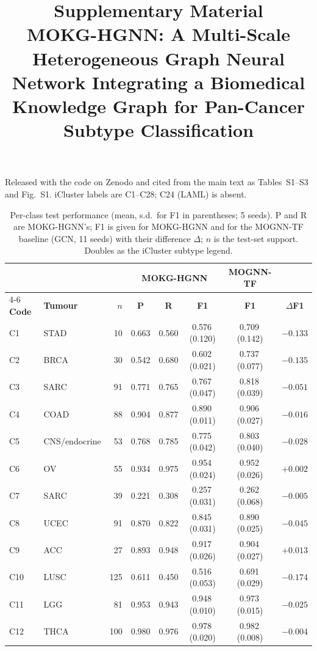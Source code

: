\documentclass[10pt]{article}
\title{\vspace{-1.2em}Supplementary Material\\[0.2em]
\large MOKG-HGNN: A Multi-Scale Heterogeneous Graph Neural Network
Integrating a Biomedical Knowledge Graph for Pan-Cancer Subtype
Classification}
\author{}
\date{}
\begin{document}
\maketitle
\vspace{-2.2em}

\noindent Released with the code on Zenodo and cited from the main text as
Tables~S1--S3 and Fig.~S1. iCluster labels are C1--C28; C24 (LAML) is absent.

\begin{table}[h]
\centering
\caption{Per-class test performance (mean, s.d.\ for F1 in parentheses;
5 seeds). P and R are MOKG-HGNN's; F1 is given for MOKG-HGNN and for the
MOGNN-TF baseline (GCN, 11 seeds) with their difference $\Delta$; $n$ is the
test-set support. Doubles as the iCluster subtype legend.}
\label{tab:s_per_class}
\small
\setlength{\tabcolsep}{5pt}
\begin{tabular}{llr ccc c c}
\toprule
 & & & \multicolumn{3}{c}{\textbf{MOKG-HGNN}} & \textbf{MOGNN-TF} & \\
\cmidrule(lr){4-6}
\textbf{Code} & \textbf{Tumour} & \textbf{$n$} & \textbf{P} & \textbf{R} & \textbf{F1} & \textbf{F1} & \textbf{$\Delta$F1} \\
\midrule
C1 & STAD & 10 & 0.663 & 0.560 & 0.576\,(0.120) & 0.709\,(0.142) & $-0.133$ \\
C2 & BRCA & 30 & 0.542 & 0.680 & 0.602\,(0.021) & 0.737\,(0.077) & $-0.135$ \\
C3 & SARC & 91 & 0.771 & 0.765 & 0.767\,(0.047) & 0.818\,(0.039) & $-0.051$ \\
C4 & COAD & 88 & 0.904 & 0.877 & 0.890\,(0.011) & 0.906\,(0.027) & $-0.016$ \\
C5 & CNS/endocrine & 53 & 0.768 & 0.785 & 0.775\,(0.042) & 0.803\,(0.040) & $-0.028$ \\
C6 & OV & 55 & 0.934 & 0.975 & 0.954\,(0.024) & 0.952\,(0.026) & $+0.002$ \\
C7 & SARC & 39 & 0.221 & 0.308 & 0.257\,(0.031) & 0.262\,(0.068) & $-0.005$ \\
C8 & UCEC & 91 & 0.870 & 0.822 & 0.845\,(0.031) & 0.890\,(0.025) & $-0.045$ \\
C9 & ACC & 27 & 0.893 & 0.948 & 0.917\,(0.026) & 0.904\,(0.027) & $+0.013$ \\
C10 & LUSC & 125 & 0.611 & 0.450 & 0.516\,(0.053) & 0.691\,(0.029) & $-0.174$ \\
C11 & LGG & 81 & 0.953 & 0.943 & 0.948\,(0.010) & 0.973\,(0.015) & $-0.025$ \\
C12 & THCA & 100 & 0.980 & 0.976 & 0.978\,(0.020) & 0.982\,(0.008) & $-0.004$ \\

\end{tabular}
\end{table}
\end{document}
